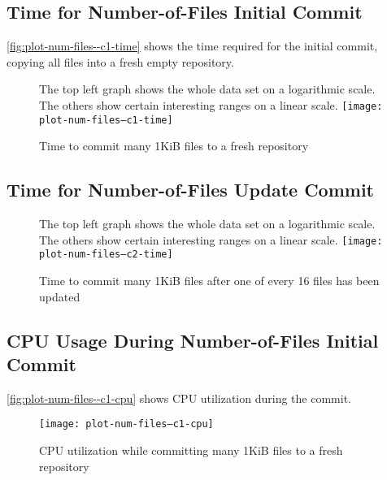 \subsection{Time for Number-of-Files Initial Commit}

\autoref{fig:plot-num-files--c1-time} shows the time
required for the initial commit, copying all files into a fresh empty
repository.


\begin{figure}[p]
    \caption{Time to commit many 1KiB files to a fresh repository}
    \label{fig:plot-num-files--c1-time}
    \centering
    The top left graph shows the whole data set on a logarithmic scale. The
    others show certain interesting ranges on a linear scale.
    \texttt{[image: plot-num-files--c1-time]}
\end{figure}

%


\subsection{Time for Number-of-Files Update Commit}


\begin{figure}[p]
    \caption{Time to commit many 1KiB files after one of every \num{16} files
    has been updated}
    \label{fig:plot-num-files--c2-time}
    \centering
    The top left graph shows the whole data set on a logarithmic scale. The
    others show certain interesting ranges on a linear scale.
    \texttt{[image: plot-num-files--c2-time]}
\end{figure}

%


\subsection{CPU Usage During Number-of-Files Initial Commit}

\autoref{fig:plot-num-files--c1-cpu} shows CPU utilization
during the commit.


\begin{figure}[p]
  \caption{CPU utilization while committing many 1KiB files to a fresh
  repository}
  \label{fig:plot-num-files--c1-cpu}
  \centering
    \texttt{[image: plot-num-files--c1-cpu]}
\end{figure}

